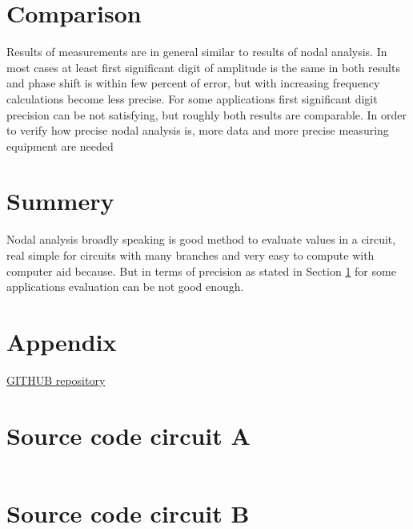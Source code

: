 \documentclass[notitlepage, a4paper, 11pt]{article}
\begin{document}
	\section{Comparison}\label{sec:comparison}
	Results of measurements are in general similar to results of nodal analysis. In most cases at least first significant digit of amplitude is the same in both results and phase shift is within few percent of error, but with increasing frequency calculations become less precise. For some applications first significant digit precision can be not satisfying, but roughly both results are comparable. In order to verify how precise nodal analysis is, more data and more precise measuring equipment are needed
	\section{Summery}
	Nodal analysis broadly speaking is good method to evaluate values in a circuit, real simple for circuits with many branches and very easy to compute with computer aid because. But in terms of precision as stated in Section \ref{sec:comparison} for some applications evaluation can be not good enough. 
	\newpage
	\appendix
	\section*{Appendix}\label{Appendix}
	\href{https://github.com/kamilix2003/CT-labs}{GITHUB repository}
	\section{Source code circuit A}
	\inputminted{python}{../CircuitA.py}
	\label{code:A}
	\newpage
	\section{Source code circuit B}
	\inputminted{python}{../CircuitB.py}
	\label{code:B}
\end{document}
